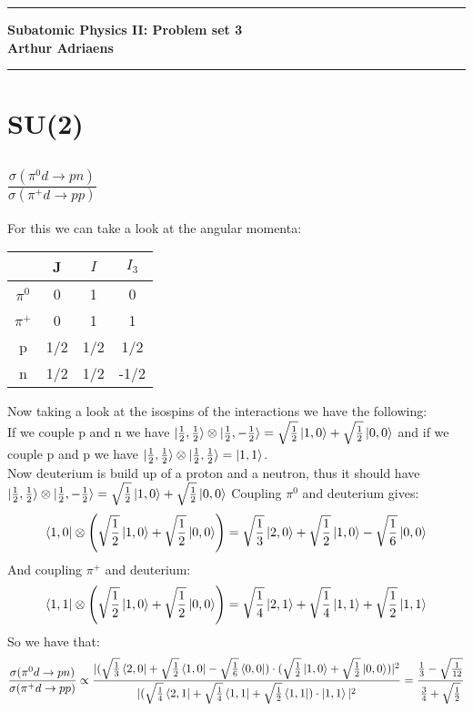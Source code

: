 \documentclass[10pt,a4paper,twoside]{article}
\begin{document}
	\begin{center}
		\hrule
		\vspace{.4cm}
		{\bf {\huge Subatomic Physics II: Problem set 3}}
		\vspace{.2cm}
		\\
		{\bf Arthur Adriaens}
		\vspace{.2cm}
		\hrule
	\end{center}
\section{SU(2)}
\subsection{$\frac{\sigma(\pi^0d \rightarrow pn)}{\sigma(\pi^+d \rightarrow pp)}$}
For this we can take a look at the angular momenta\cite{ParticlesAndNuclei}:
\begin{center}
	\begin{tabular}{ c||ccc } 
		& J & $I$  & $I_3$\\ 
		\hline
		$\pi^0$ & 0 & 1 & 0 \\ 
		$\pi^+$ & 0 & 1 & 1 \\
		p & 1/2 & 1/2 & 1/2\\
		n & 1/2 & 1/2 & -1/2
	\end{tabular}
\end{center}
Now taking a look at the isospins of the interactions we have the following:\\
If we couple p and n we have $\ket{\frac{1}{2},\frac{1}{2}}\otimes\ket{\frac{1}{2},-\frac{1}{2}} = \sqrt{\frac{1}{2}}\ket{1,0} + \sqrt{\frac{1}{2}}\ket{0,0}$ and if we couple p and p we have $\ket{\frac{1}{2},\frac{1}{2}}\otimes\ket{\frac{1}{2},\frac{1}{2}} = \ket{1,1}$.\\
Now deuterium is build up of a proton and a neutron, thus it should have $\ket{\frac{1}{2},\frac{1}{2}}\otimes\ket{\frac{1}{2},-\frac{1}{2}} = \sqrt{\frac{1}{2}}\ket{1,0} + \sqrt{\frac{1}{2}}\ket{0,0}$
 Coupling $\pi^0$ and deuterium gives:
 \begin{equation}
 	\bra{1,0}\otimes\left(\sqrt{\frac{1}{2}}\ket{1,0} + \sqrt{\frac{1}{2}}\ket{0,0}\right) = \sqrt{\frac{1}{3}}\ket{2,0} + \sqrt{\frac{1}{2}}\ket{1,0} - \sqrt{\frac{1}{6}}\ket{0,0}
 \end{equation}
 And coupling $\pi^+$ and deuterium:
\begin{equation}
 \bra{1,1}\otimes\left(\sqrt{\frac{1}{2}}\ket{1,0} + \sqrt{\frac{1}{2}}\ket{0,0}\right) = \sqrt{\frac{1}{4}}\ket{2,1} + \sqrt{\frac{1}{4}}\ket{1,1} + \sqrt{\frac{1}{2}}\ket{1,1}
\end{equation}
So we have that:
\begin{equation}
	\frac{\sigma(\pi^0d \rightarrow pn)}{\sigma(\pi^+d \rightarrow pp)}\propto
	\frac{|(\sqrt{\frac{1}{3}}\bra{2,0} + \sqrt{\frac{1}{2}}\bra{1,0} - \sqrt{\frac{1}{6}}\bra{0,0})\cdot(\sqrt{\frac{1}{2}}\ket{1,0} + \sqrt{\frac{1}{2}}\ket{0,0})|^2}{|(\sqrt{\frac{1}{4}}\bra{2,1} + \sqrt{\frac{1}{4}}\bra{1,1} + \sqrt{\frac{1}{2}}\bra{1,1})\cdot\ket{1,1}|^2} 
	= \frac{\frac{1}{3} - \sqrt{\frac{1}{12}}}{\frac{3}{4} + \sqrt{\frac{1}{2}}}
\end{equation}
\end{document}
